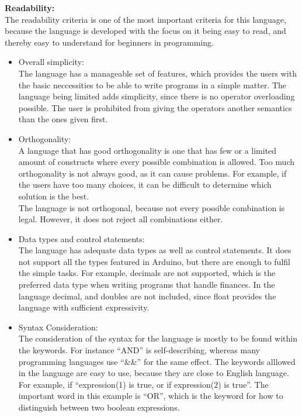 \textbf{Readability:} \\
The readability criteria is one of the most important criteria for this language, because the language is developed with the focus on it being easy to read, and thereby easy to understand for beginners in programming. \\
\begin{itemize}
\item Overall simplicity:\\
The language has a manageable set of features, which provides the users with the basic neccessities to be able to write programs in a simple matter. The language being limited adds simplicity, since there is no operator overloading possible. The user is prohibited from giving the operators another semantics than the ones given first. 
\item Orthogonality:\\
A language that has good orthogonality is one that has few or a limited amount of constructs where every possible combination is allowed. Too much orthogonality is not always good, as it can cause problems. For example, if the users have too many choices, it can be difficult to determine which solution is the best.\\
The language is not orthogonal, because not every possible combination is legal. However, it does not reject all combinations either.  
\item Data types and control statements:\\
The language has adequate data types as well as control statements. It does not support all the types featured in Arduino, but there are enough to fulfil the simple tasks. For example, decimals are not supported, which is the preferred data type when writing programs that handle finances. In the language decimal, and doubles are not included, since float provides the language with sufficient expressivity.
\item Syntax Consideration:\\
The consideration of the syntax for the language is mostly to be found within the keywords. For instance ``AND'' is self-describing, whereas many programming languages use ``\&\&'' for the same effect. The keywords alllowed in the language are easy to use, because they are close to English language. For example, if ``expression(1) is true, or if expression(2) is true''. The important word in this example is ``OR'', which is the keyword for how to distinguish between two boolean expressions.
\end{itemize}
